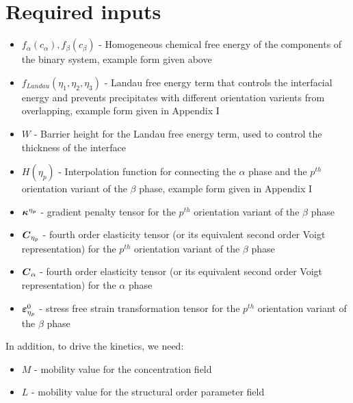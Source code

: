 \documentclass[11pt]{article}
\renewcommand{\=}[1]{\stackrel{#1}{=}} %
\theoremstyle{definition}
\theoremstyle{remark}
\def\Bkappa{\mbox{\boldmath$\kappa$}}
\def\Bvarepsilon{\mbox{\boldmath$\varepsilon$}}
\def\bC{\mbox{\boldmath$ C$}}
\begin{document}
\section{Required inputs}
\begin{itemize}
\item $f_{\alpha}(c_{\alpha}), f_{\beta}(c_{\beta})$ - Homogeneous chemical free energy of the components of the binary system, example form given above
\item $f_{Landau}(\eta_1, \eta_2, \eta_3)$ - Landau free energy term that controls the interfacial energy and prevents precipitates with different orientation varients from overlapping, example form given in Appendix I
\item $W$ - Barrier height for the Landau free energy term, used to control the thickness of the interface 
\item $H(\eta_p)$ - Interpolation function for connecting the $\alpha$ phase and the $p^{th}$ orientation variant of the $\beta$ phase, example form given in Appendix I
\item $\Bkappa^{\eta_p}$  - gradient penalty tensor for the $p^{th}$ orientation variant of the $\beta$ phase
\item $\bC_{\eta_p}$ - fourth order elasticity tensor (or its equivalent second order Voigt representation) for the $p^{th}$ orientation variant of the $\beta$ phase
\item $\bC_{\alpha}$ - fourth order elasticity tensor (or its equivalent second order Voigt representation) for the $\alpha$ phase
\item $\Bvarepsilon^0_{\eta_p}$ - stress free strain transformation tensor for the $p^{th}$ orientation variant of the $\beta$ phase
\end{itemize}
In addition, to drive the kinetics, we need:
\begin{itemize}
\item $M$  - mobility value for the concentration field
\item $L$  - mobility value for the structural order parameter field
\end{itemize}
\end{document}
